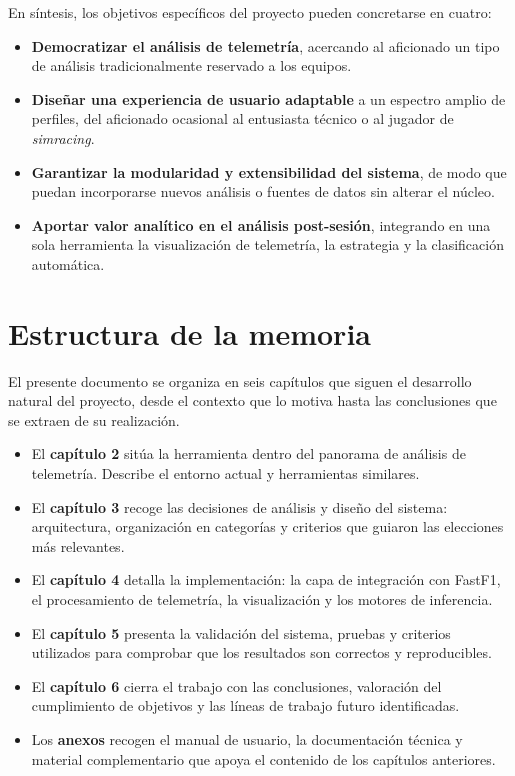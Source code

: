 \documentclass[12pt,a4paper,twoside,openright]{book}
\begin{document}
\noindent En síntesis, los objetivos específicos del proyecto pueden concretarse en cuatro:
\begin{itemize}
  \item \textbf{Democratizar el análisis de telemetría}, acercando al aficionado un tipo de análisis tradicionalmente reservado a los equipos.
  \item \textbf{Diseñar una experiencia de usuario adaptable} a un espectro amplio de perfiles, del aficionado ocasional al entusiasta técnico o al jugador de \textit{simracing}.
  \item \textbf{Garantizar la modularidad y extensibilidad del sistema}, de modo que puedan incorporarse nuevos análisis o fuentes de datos sin alterar el núcleo.
  \item \textbf{Aportar valor analítico en el análisis post-sesión}, integrando en una sola herramienta la visualización de telemetría, la estrategia y la clasificación automática.
\end{itemize}

\section{Estructura de la memoria}
El presente documento se organiza en seis capítulos que siguen el desarrollo natural del proyecto, desde el contexto que lo motiva hasta las conclusiones que se extraen de su realización.

\begin{itemize}
  \item El \textbf{capítulo 2} sitúa la herramienta dentro del panorama de análisis de telemetría. Describe el entorno actual y herramientas similares.
  \item El \textbf{capítulo 3} recoge las decisiones de análisis y diseño del sistema: arquitectura, organización en categorías y criterios que guiaron las elecciones más relevantes.
  \item El \textbf{capítulo 4} detalla la implementación: la capa de integración con FastF1, el procesamiento de telemetría, la visualización y los motores de inferencia.
  \item El \textbf{capítulo 5} presenta la validación del sistema, pruebas y criterios utilizados para comprobar que los resultados son correctos y reproducibles.
  \item El \textbf{capítulo 6} cierra el trabajo con las conclusiones, valoración del cumplimiento de objetivos y las líneas de trabajo futuro identificadas.
  \item Los \textbf{anexos} recogen el manual de usuario, la documentación técnica y material complementario que apoya el contenido de los capítulos anteriores.
\end{itemize}
\end{document}
